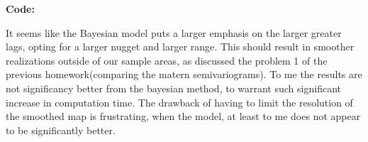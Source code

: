 \documentclass[12pt]{article}
\makeatletter
\theoremstyle{homework}
\newenvironment{exercise}[1]
{\def\@currentlabel{#1}\exercisecore}
{\endexercisecore}
\makeatother
\begin{document}
\begin{exercise}{7}
\begin{figure}[H]
\begin{center}
    \end{center}
  \end{figure}
  \textbf{Code:}
  \begin{center}
  
  \end{center}
  It seems like the Bayesian model puts a larger emphasis on the larger greater lags, opting for a larger nugget and larger range. This should result in 
  smoother realizations outside of our sample areas, as discussed the problem 1 of the previous homework(comparing the matern semivariograms). To me the results are 
  not significancy better from the bayesian method, to warrant such significant increase in computation time. The drawback of having to limit the resolution of the smoothed map is 
  frustrating, when the model, at least to me does not appear to be significantly better. 



\end{exercise}
\end{document}
